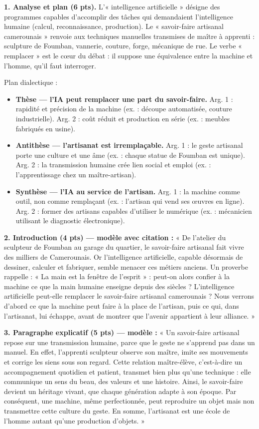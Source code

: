 \documentclass[11pt]{article}
\begin{document}
\begin{corrige}
\textbf{1. Analyse et plan (6 pts).} L'« intelligence artificielle » désigne des programmes capables d'accomplir des tâches qui demandaient l'intelligence humaine (calcul, reconnaissance, production). Le « savoir-faire artisanal camerounais » renvoie aux techniques manuelles transmises de maître à apprenti : sculpture de Foumban, vannerie, couture, forge, mécanique de rue. Le verbe « remplacer » est le cœur du débat : il suppose une équivalence entre la machine et l'homme, qu'il faut interroger.

Plan dialectique :
\begin{itemize}
\item \textbf{Thèse — l'IA peut remplacer une part du savoir-faire.} Arg. 1 : rapidité et précision de la machine (ex. : découpe automatisée, couture industrielle). Arg. 2 : coût réduit et production en série (ex. : meubles fabriqués en usine).
\item \textbf{Antithèse — l'artisanat est irremplaçable.} Arg. 1 : le geste artisanal porte une culture et une âme (ex. : chaque statue de Foumban est unique). Arg. 2 : la transmission humaine crée lien social et emploi (ex. : l'apprentissage chez un maître-artisan).
\item \textbf{Synthèse — l'IA au service de l'artisan.} Arg. 1 : la machine comme outil, non comme remplaçant (ex. : l'artisan qui vend ses œuvres en ligne). Arg. 2 : former des artisans capables d'utiliser le numérique (ex. : mécanicien utilisant le diagnostic électronique).
\end{itemize}

\textbf{2. Introduction (4 pts) — modèle avec citation :} « De l'atelier du sculpteur de Foumban au garage du quartier, le savoir-faire artisanal fait vivre des milliers de Camerounais. Or l'intelligence artificielle, capable désormais de dessiner, calculer et fabriquer, semble menacer ces métiers anciens. Un proverbe rappelle : « La main est la fenêtre de l'esprit » : peut-on alors confier à la machine ce que la main humaine enseigne depuis des siècles ? L'intelligence artificielle peut-elle remplacer le savoir-faire artisanal camerounais ? Nous verrons d'abord ce que la machine peut faire à la place de l'artisan, puis ce qui, dans l'artisanat, lui échappe, avant de montrer que l'avenir appartient à leur alliance. »

\textbf{3. Paragraphe explicatif (5 pts) — modèle :} « Un savoir-faire artisanal repose sur une transmission humaine, parce que le geste ne s'apprend pas dans un manuel. En effet, l'apprenti sculpteur observe son maître, imite ses mouvements et corrige les siens sous son regard. Cette relation maître-élève, c'est-à-dire un accompagnement quotidien et patient, transmet bien plus qu'une technique : elle communique un sens du beau, des valeurs et une histoire. Ainsi, le savoir-faire devient un héritage vivant, que chaque génération adapte à son époque. Par conséquent, une machine, même perfectionnée, peut reproduire un objet mais non transmettre cette culture du geste. En somme, l'artisanat est une école de l'homme autant qu'une production d'objets. »


\end{corrige}
\end{document}
